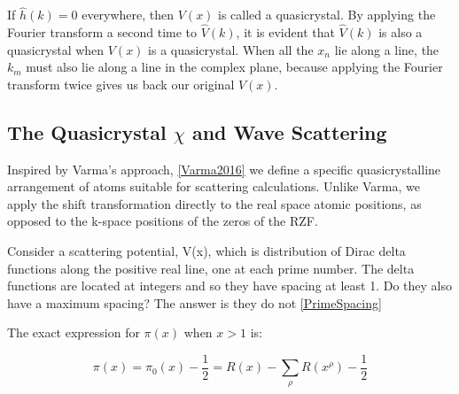 \documentclass[11pt, oneside]{article}   	%
\begin{document}
If $\hat{h}(k) = 0$ everywhere, then $V(x)$ is called a quasicrystal.
By applying the Fourier transform a second time to $\hat{V}(k)$, it is evident that $\hat{V}(k)$ is also a quasicrystal when $V(x)$ is a quasicrystal. When all the $x_n$ lie along a line, the $k_m$ must also lie along a line in the complex plane, because applying the Fourier transform twice gives us back our original $V(x)$.










\subsection{The Quasicrystal $\chi$ and Wave Scattering}
Inspired by Varma's approach, \ref{Varma2016} we define a specific quasicrystalline arrangement of atoms suitable for scattering calculations.
Unlike Varma, we apply the shift transformation directly to the real space atomic positions, as opposed to the k-space positions of the zeros of the RZF.

Consider a scattering potential, V(x), which is distribution of Dirac delta functions along the positive real line, one at each prime number. 
The delta functions are located at integers and so they have spacing at least 1.
Do they also have a maximum spacing? The answer is they do not \ref{PrimeSpacing}

The exact expression \cite{Riemann} for $\pi(x)$ when $x>1$ is:

\begin{equation}
\pi(x) = \pi_0(x) - \frac{1}{2} = R(x) - \sum_{\rho}R(x^{\rho}) - \frac{1}{2}
\end{equation}
\end{document}
